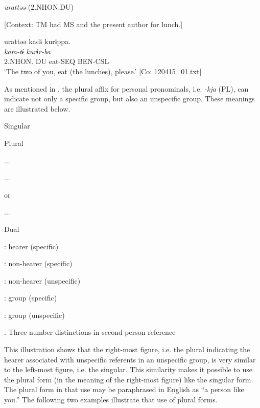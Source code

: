  \ex \label{ex:5:b} \textit{urattəə} (2.NHON.DU)

    [Context: TM had MS and the present author for lunch.]

\glll  urattəə  kadɨ  kurɨppa.\\
\textit{}  \textit{kam-tɨ}  \textit{kurɨr-ba}\\
2.NHON. DU  eat-SEQ  BEN-CSL\\
\glt ‘The two of you, eat (the lunches), please.’ [Co: 120415\_01.txt]
\z
\z

  As mentioned in , the plural affix for personal pronominals, i.e. \textit{{}-kja} (PL), can indicate not only a specific group, but also an unspecific group. These meanings are illustrated below.


Singular

Plural

...

...

or

...

Dual


: hearer (specific)

: non-hearer (specific)

: non-hearer (unspecific)

: group (specific)

: group (unspecific)

\begin{styleBeschriftung}
\textmd{. Three number distinctions in second-person reference}
\end{styleBeschriftung}

This illustration shows that the right-most figure, i.e. the plural indicating the hearer associated with unspecific referents in an unspecific group, is very similar to the left-most figure, i.e. the singular. This similarity makes it possible to use the plural form (in the meaning of the right-most figure) like the singular form. The plural form in that use may be paraphrased in English as “a person like you.” The following two examples illustrate that use of plural forms.

